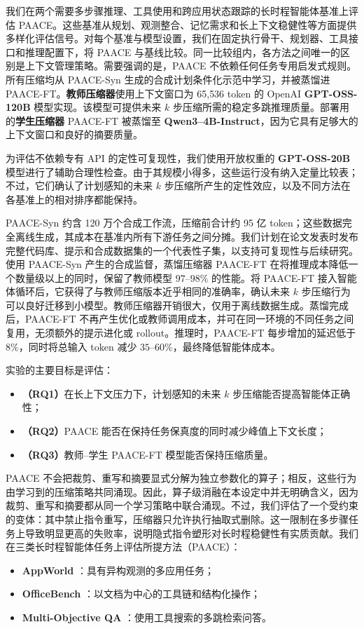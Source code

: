 \documentclass[10pt,twocolumn]{article}
\begin{document}
我们在两个需要多步骤推理、工具使用和跨应用状态跟踪的长时程智能体基准上评估 PAACE。这些基准从规划、观测整合、记忆需求和长上下文稳健性等方面提供多样化评估信号。对每个基准与模型设置，我们在固定执行骨干、规划器、工具接口和推理配置下，将 PAACE 与基线比较。同一比较组内，各方法之间唯一的区别是上下文管理策略。需要强调的是，PAACE 不依赖任何任务专用启发式规则。所有压缩均从 PAACE-Syn 生成的合成计划条件化示范中学习，并被蒸馏进 PAACE-FT。\textbf{教师压缩器}使用上下文窗口为 65{,}536 token 的 OpenAI \textbf{GPT-OSS-120B} 模型实现。该模型可提供未来 $k$ 步压缩所需的稳定多跳推理质量。部署用的\textbf{学生压缩器} PAACE-FT 被蒸馏至 \textbf{Qwen3--4B-Instruct}，因为它具有足够大的上下文窗口和良好的摘要质量。

为评估不依赖专有 API 的定性可复现性，我们使用开放权重的 \textbf{GPT-OSS-20B} 模型进行了辅助合理性检查。由于其规模小得多，这些运行没有纳入定量比较表；不过，它们确认了计划感知的未来 $k$ 步压缩所产生的定性效应，以及不同方法在各基准上的相对排序都能保持。

PAACE-Syn 约含 120 万个合成工作流，压缩前合计约 95 亿 token；这些数据完全离线生成，其成本在基准内所有下游任务之间分摊。我们计划在论文发表时发布完整代码库、提示和合成数据集的一个代表性子集，以支持可复现性与后续研究。使用 PAACE-Syn 产生的合成监督，蒸馏压缩器 PAACE-FT 在将推理成本降低一个数量级以上的同时，保留了教师模型 $97$--$98\%$ 的性能。将 PAACE-FT 接入智能体循环后，它获得了与教师压缩版本近乎相同的准确率，确认未来 $k$ 步压缩行为可以良好迁移到小模型。教师压缩器开销很大，仅用于离线数据生成。蒸馏完成后，PAACE-FT 不再产生优化或教师调用成本，并可在同一环境的不同任务之间复用，无须额外的提示进化或 rollout。推理时，PAACE-FT 每步增加的延迟低于 $8\%$，同时将总输入 token 减少 $35$--$60\%$，最终降低智能体成本。

实验的主要目标是评估：
\begin{itemize}
  \item \textbf{（RQ1）}在长上下文压力下，计划感知的未来 $k$ 步压缩能否提高智能体正确性；
  \item \textbf{（RQ2）}PAACE 能否在保持任务保真度的同时减少峰值上下文长度；
  \item \textbf{（RQ3）}教师--学生 PAACE-FT 模型能否保持压缩质量。
\end{itemize}

PAACE 不会把裁剪、重写和摘要显式分解为独立参数化的算子；相反，这些行为由学习到的压缩策略共同涌现。因此，算子级消融在本设定中并无明确含义，因为裁剪、重写和摘要都从同一个学习策略中联合涌现。不过，我们评估了一个受约束的变体：其中禁止指令重写，压缩器只允许执行抽取式删除。这一限制在多步骤任务上导致明显更高的失败率，说明隐式指令塑形对长时程稳健性有实质贡献。我们在三类长时程智能体任务上评估所提方法（PAACE）：
\begin{itemize}
  \item \textbf{AppWorld} \citep{trivedi2024appworld}：具有异构观测的多应用任务；
  \item \textbf{OfficeBench} \citep{wang2024officebench}：以文档为中心的工具链和结构化操作；
  \item \textbf{Multi-Objective QA} \citep{zhou2025mem1}：使用工具搜索的多跳检索问答。
\end{itemize}
\end{document}
